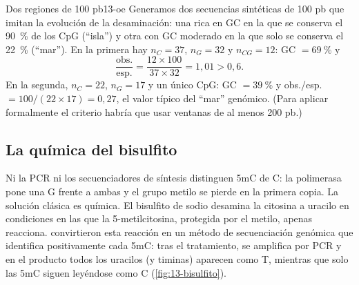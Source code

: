 \begin{ejemplo}{Dos regiones de 100 pb}{13-oe}
Generamos dos secuencias sintéticas de 100 pb que imitan la evolución de la desaminación: una rica en GC en la que se conserva el \SI{90}{\percent} de los CpG (``isla'') y otra con GC moderado en la que solo se conserva el \SI{22}{\percent} (``mar''). En la primera hay $n_C=37$, $n_G=32$ y $n_{CG}=12$: GC $=\SI{69}{\percent}$ y
\[
\frac{\text{obs.}}{\text{esp.}} = \frac{12\times100}{37\times32} = 1{,}01 > 0{,}6 .
\]
En la segunda, $n_C=22$, $n_G=17$ y un único CpG: GC $=\SI{39}{\percent}$ y obs./esp. $=100/(22\times17)=0{,}27$, el valor típico del ``mar'' genómico. (Para aplicar formalmente el criterio habría que usar ventanas de al menos 200 pb.)
\end{ejemplo}

\subsection{La química del bisulfito}

Ni la PCR ni los secuenciadores de síntesis distinguen 5mC de C: la polimerasa pone una G frente a ambas y el grupo metilo se pierde en la primera copia. La solución clásica es química. El bisulfito de sodio desamina la citosina a uracilo en condiciones en las que la 5-metilcitosina, protegida por el metilo, apenas reacciona. \textcite{c13-frommer1992} convirtieron esta reacción en un método de secuenciación genómica que identifica positivamente cada 5mC: tras el tratamiento, se amplifica por PCR y en el producto todos los uracilos (y timinas) aparecen como T, mientras que solo las 5mC siguen leyéndose como C (\cref{fig:13-bisulfito}).

